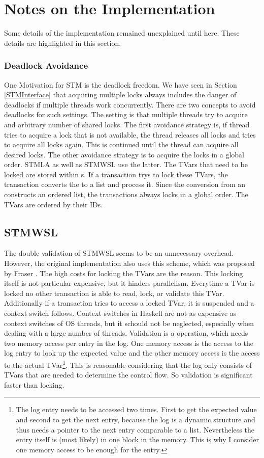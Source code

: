 \section{Notes on the Implementation}
Some details of the implementation remained unexplained until here. These details are highlighted
in this section.

\subsubsection{Deadlock Avoidance}
One Motivation for STM is the deadlock freedom. We have seen in Section \ref{STMInterface} that acquiring 
multiple locks always includes the danger of deadlocks if multiple threads work concurrently. 
There are two concepts to avoid deadlocks for such settings. The setting is that multiple threads
try to acquire and arbitrary number of shared locks. The first avoidance strategy is, if thread tries to 
acquire a lock that is not available, the thread releases all locks and tries to acquire all locks again.
This is continued until the thread can acquire all desired locks. The other avoidance strategy is to 
acquire the locks in a global order. STMLA as well as STMWSL use the latter. The TVars that need to be 
locked are stored within s. If a transaction trys to lock these TVars, the transaction converts 
the  to a list and process it. Since the conversion from an  constructs an ordered 
list, the transactions always locks in a global order. The TVars are ordered by their IDs.


\subsection{STMWSL}
The double validation of STMWSL seems to be an unnecessary overhead. However, the original implementation 
also uses this scheme, which was proposed by Fraser \parencite[Page 42]{lockfreedom}. The high costs for locking the TVars
are the reason. This locking itself is not particular expensive, but it hinders parallelism.
Everytime a TVar is locked no other transaction is able to read, lock, or validate this TVar. Additionally if 
a transaction tries to access a locked TVar, it is suspended and a context switch follows. Context switches in Haskell 
are not as expensive as context switches of OS threads, but it schould not be neglected, especially when dealing
with a large number of threads. Validation is a operation, which needs two memory access per entry in the log.
One memory access is the access to the log entry to look up the expected value and the other memory access is
the access to the actual TVar\footnote{The log entry needs to be accessed two times. First to get the expected
value and second to get the next entry, because the log is a dynamic structure and thus needs a pointer
to the next entry comparable to a list. Nevertheless the entry itself is (most likely) in one block in the memory.
This is why I consider one memory access to be enough for the entry.}. This is reasonable considering that the 
log only consists of TVars that are needed to determine the control flow. So validation is significant faster
than locking. 


